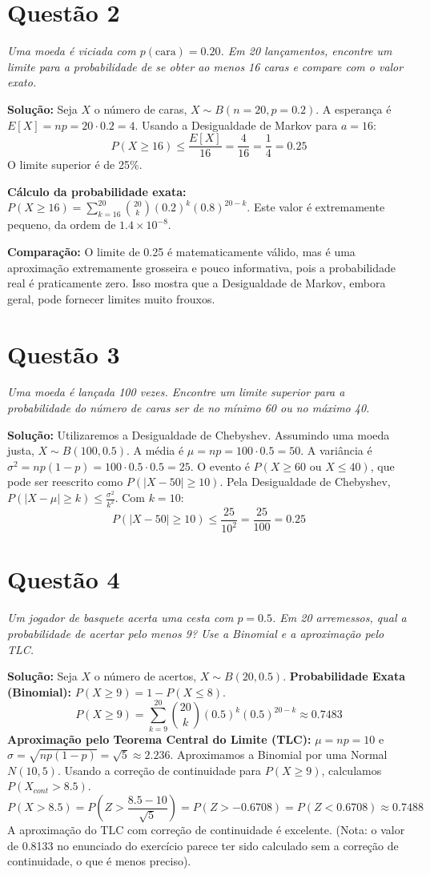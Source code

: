 \documentclass[12pt, a4paper]{article}
\begin{document}
\section*{Questão 2}
\textit{Uma moeda é viciada com $p(\text{cara})=0.20$. Em 20 lançamentos, encontre um limite para a probabilidade de se obter ao menos 16 caras e compare com o valor exato.}

\textbf{Solução:}
Seja $X$ o número de caras, $X \sim B(n=20, p=0.2)$. A esperança é $E[X] = np = 20 \cdot 0.2 = 4$.
Usando a Desigualdade de Markov para $a=16$:
$$ P(X \ge 16) \le \frac{E[X]}{16} = \frac{4}{16} = \frac{1}{4} = 0.25 $$
O limite superior é de 25\%.

\textbf{Cálculo da probabilidade exata:}
$P(X \ge 16) = \sum_{k=16}^{20} \binom{20}{k} (0.2)^k (0.8)^{20-k}$. Este valor é extremamente pequeno, da ordem de $1.4 \times 10^{-8}$.

\textbf{Comparação:} O limite de 0.25 é matematicamente válido, mas é uma aproximação extremamente grosseira e pouco informativa, pois a probabilidade real é praticamente zero. Isso mostra que a Desigualdade de Markov, embora geral, pode fornecer limites muito frouxos.

\section*{Questão 3}
\textit{Uma moeda é lançada 100 vezes. Encontre um limite superior para a probabilidade do número de caras ser de no mínimo 60 ou no máximo 40.}

\textbf{Solução:}
Utilizaremos a Desigualdade de Chebyshev. Assumindo uma moeda justa, $X \sim B(100, 0.5)$.
A média é $\mu = np = 100 \cdot 0.5 = 50$.
A variância é $\sigma^2 = np(1-p) = 100 \cdot 0.5 \cdot 0.5 = 25$.
O evento é $P(X \ge 60 \text{ ou } X \le 40)$, que pode ser reescrito como $P(|X - 50| \ge 10)$.
Pela Desigualdade de Chebyshev, $P(|X - \mu| \ge k) \le \frac{\sigma^2}{k^2}$.
Com $k=10$:
$$ P(|X - 50| \ge 10) \le \frac{25}{10^2} = \frac{25}{100} = 0.25 $$

\section*{Questão 4}
\textit{Um jogador de basquete acerta uma cesta com $p=0.5$. Em 20 arremessos, qual a probabilidade de acertar pelo menos 9? Use a Binomial e a aproximação pelo TLC.}

\textbf{Solução:}
Seja $X$ o número de acertos, $X \sim B(20, 0.5)$.
\textbf{Probabilidade Exata (Binomial):} $P(X \ge 9) = 1 - P(X \le 8)$.
$$ P(X \ge 9) = \sum_{k=9}^{20} \binom{20}{k}(0.5)^k(0.5)^{20-k} \approx 0.7483 $$
\textbf{Aproximação pelo Teorema Central do Limite (TLC):}
$\mu = np = 10$ e $\sigma = \sqrt{np(1-p)} = \sqrt{5} \approx 2.236$.
Aproximamos a Binomial por uma Normal $N(10, 5)$. Usando a correção de continuidade para $P(X \ge 9)$, calculamos $P(X_{cont} > 8.5)$.
$$ P(X > 8.5) = P\left(Z > \frac{8.5 - 10}{\sqrt{5}}\right) = P(Z > -0.6708) = P(Z < 0.6708) \approx 0.7488 $$
A aproximação do TLC com correção de continuidade é excelente. (Nota: o valor de 0.8133 no enunciado do exercício parece ter sido calculado sem a correção de continuidade, o que é menos preciso).
\end{document}
